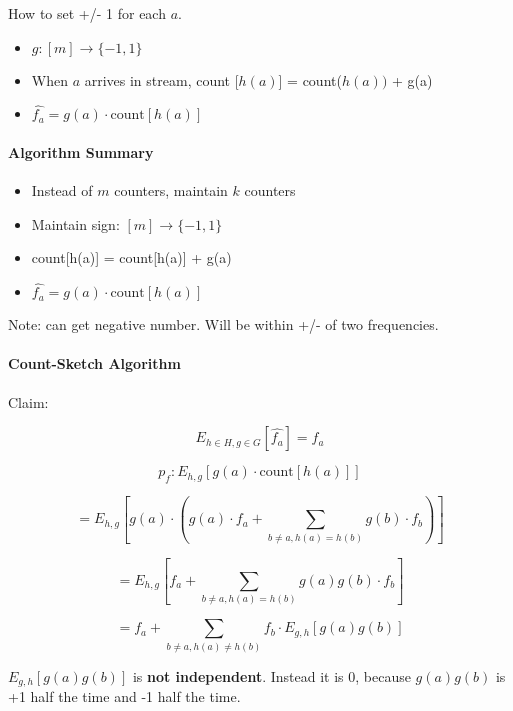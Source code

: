 \documentclass[11pt]{article}
\begin{document}
How to set +/- 1 for each $a$.

\begin{itemize}

	\item $g : [m] \rightarrow \{-1, 1\}$

	\item When $a$ arrives in stream, count [$h(a)$] = count($h(a))$ + g(a)

	\item $\hat{f_a} = g(a) \cdot \text{count}[h(a)]$

\end{itemize}

\paragraph{Algorithm Summary}

\begin{itemize}

	\item Instead of $m$ counters, maintain $k$ counters
	
	\item Maintain sign:
		$[m] \rightarrow \{-1, 1\}$
		
	\item count[h(a)] = count[h(a)] + g(a)
	
	\item $\hat{f_a} = g(a) \cdot \text{count}[h(a)]$

\end{itemize}

Note: can get negative number. Will be within +/- of two frequencies.

\paragraph{Count-Sketch Algorithm}

Claim: 

\[E_{h \in H, g \in G} [\hat{f_a}] = f_a\]

\[p_f: E_{h, g} [g(a) \cdot \text{count}[h(a)]]\]

\[ = E_{h, g} [g(a) \cdot (g(a) \cdot f_a + \sum_{b \neq a, h(a) = h(b)} g(b) \cdot f_b)] \]

\[ = E_{h, g} [f_a + \sum_{b \neq a, h(a) = h(b)} g(a) g(b) \cdot f_b ]\]

\[ = f_a + \sum_{b \neq a, h(a) \neq h(b)} f_b \cdot E_{g,h} [g(a) g(b)] \]

$E_{g,h} [g(a) g(b)]$ is \textbf{not independent}. Instead it is 0, because $g(a) g(b)$ is +1 half the time and -1 half the time.
\end{document}
